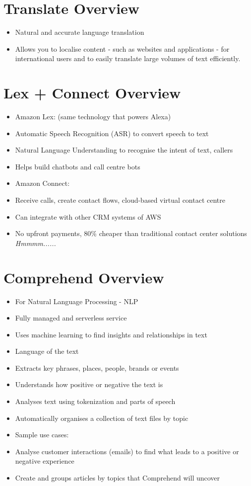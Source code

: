 \section{Translate Overview}
\begin{itemize}
    \item Natural and accurate language translation
    \item Allows you to localise content - such as websites and applications - for international users and to easily translate large volumes of text efficiently.
\end{itemize}


\section{Lex + Connect Overview}
\begin{itemize}
    \item Amazon Lex: (same technology that powers Alexa)
    \item Automatic Speech Recognition (ASR) to convert speech to text
    \item Natural Language Understanding to recognise the intent of text, callers
    \item Helps build chatbots and call centre bots
    \item Amazon Connect:
    \item Receive calls, create contact flows, cloud-based virtual contact centre
    \item Can integrate with other CRM systems of AWS
    \item No upfront payments, 80\% cheaper than traditional contact center solutions \textit{Hmmmm......}
\end{itemize}


\section{Comprehend Overview}
\begin{itemize}
    \item For Natural Language Processing - NLP
    \item Fully managed and serverless service
    \item Uses machine learning to find insights and relationships in text
    \item Language of the text
    \item Extracts key phrases, places, people, brands or events
    \item Understands how positive or negative the text is
    \item Analyses text using tokenization and parts of speech
    \item Automatically organises a collection of text files by topic
    \item Sample use cases:
    \item Analyse customer interactions (emails) to find what leads to a positive or negative experience
    \item Create and groups articles by topics that Comprehend will uncover
\end{itemize}


